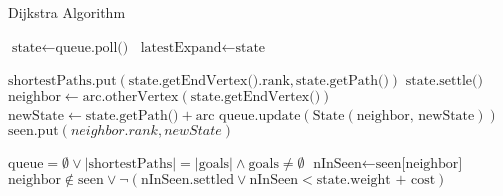 \begin{algorithm}
    \caption{Dijkstra Algorithm}
    \label{alg:disjkstra_algorithm}
    \begin{algorithmic}[1]
    \State $\text{state} \gets \text{queue.poll()}$
    \State $\text{latestExpand} \gets \text{state}$
    
        \State $\text{shortestPaths.put}(\text{state.getEndVertex().rank}, \text{state.getPath()})$
    \EndIf
    \State $\text{state.settle()}$
        \State $\text{neighbor} \gets \text{arc.otherVertex}(\text{state.getEndVertex()})$
        \State $\text{newState} \gets \text{state.getPath()} + \text{arc}$
        \State $\text{queue.update}(\text{State}(\text{neighbor, newState}))$
        \State $\text{seen.put}(neighbor.rank, newState)$
            
        \EndIf
    \EndFor
    \EndProcedure
    \State \Return $\text{queue} = \emptyset \lor |\text{shortestPaths}| = |\text{goals}| \land \text{goals} \neq \emptyset$
    \EndFunction
    \State $\text{nInSeen} \gets \text{seen[neighbor]}$ 
    \State \Return $\text{neighbor} \notin \text{seen} \lor \lnot (\text{nInSeen.settled} \lor \text{nInSeen} < \text{state.weight + cost})$
    \EndFunction
    \end{algorithmic}
\end{algorithm}